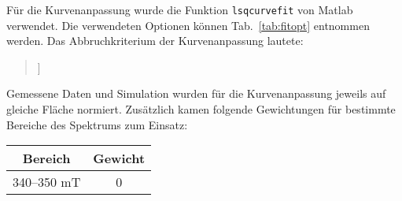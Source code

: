 \documentclass{article}
\newcommand{\matlab}{\textsf{Matlab}}
\begin{document}
\begin{center}
\setlength{\fboxsep}{1.5ex}\setlength{\fboxrule}{.75pt}
\end{center}

\clearpage


Für die Kurvenanpassung wurde die Funktion \texttt{lsqcurvefit} von \matlab{} verwendet. Die verwendeten Optionen können Tab.~\ref{tab:fitopt} entnommen werden. Das Abbruchkriterium der Kurvenanpassung lautete:

\begin{quote}\small
\ttfamily
[[@TSim.fit.report.exitmessage]]
\end{quote}

Gemessene Daten und Simulation wurden für die Kurvenanpassung jeweils auf gleiche Fläche normiert. Zusätzlich kamen folgende Gewichtungen für bestimmte Bereiche des Spektrums zum Einsatz:

\begin{center}
\begin{tabular}{cc}
\toprule
\textbf{Bereich} & \textbf{Gewicht}
\\
\midrule
340--350 mT      & 0
\\
\bottomrule
\end{tabular}
\end{center}
\end{document}
